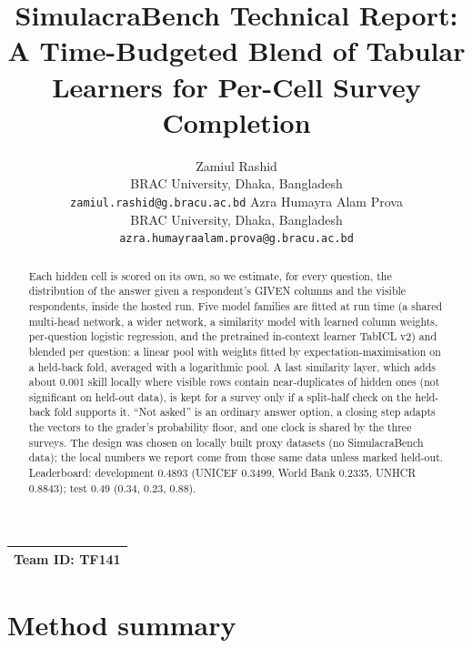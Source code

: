 \documentclass{article}
\title{SimulacraBench Technical Report:\\ A Time-Budgeted Blend of Tabular Learners for Per-Cell Survey Completion}
\author{%
  Zamiul Rashid\\
  BRAC University, Dhaka, Bangladesh\\
  \texttt{zamiul.rashid@g.bracu.ac.bd}
  \And
  Azra Humayra Alam Prova\\
  BRAC University, Dhaka, Bangladesh\\
  \texttt{azra.humayraalam.prova@g.bracu.ac.bd}
}
\newcommand{\teamid}{TF141}
\begin{document}
\maketitle

\begin{center}
\begin{tabular}{l}
\toprule
\textbf{Team ID:} \teamid \\
\bottomrule
\end{tabular}
\end{center}

\begin{abstract}
Each hidden cell is scored on its own, so we estimate, for every question, the distribution of the answer given a respondent's GIVEN columns and the visible respondents, inside the hosted run. Five model families are fitted at run time (a shared multi-head network, a wider network, a similarity model with learned column weights, per-question logistic regression, and the pretrained in-context learner TabICL v2) and blended per question: a linear pool with weights fitted by expectation-maximisation on a held-back fold, averaged with a logarithmic pool. A last similarity layer, which adds about 0.001 skill locally where visible rows contain near-duplicates of hidden ones (not significant on held-out data), is kept for a survey only if a split-half check on the held-back fold supports it. ``Not asked'' is an ordinary answer option, a closing step adapts the vectors to the grader's probability floor, and one clock is shared by the three surveys. The design was chosen on locally built proxy datasets (no SimulacraBench data); the local numbers we report come from those same data unless marked held-out. Leaderboard: development 0.4893 (UNICEF 0.3499, World Bank 0.2335, UNHCR 0.8843); test 0.49 (0.34, 0.23, 0.88).
\end{abstract}

\section{Method summary}
\label{sec:method}
\end{document}
